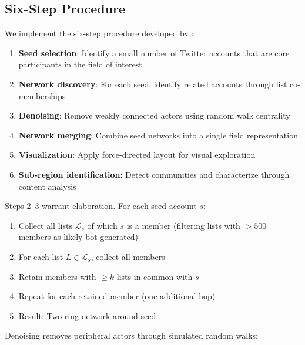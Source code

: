\documentclass[../main.tex]{subfiles}
\begin{document}
\subsection{Six-Step Procedure}

We implement the six-step procedure developed by \textcite{benabdelkrim-opening-fields-2020}:

\begin{enumerate}
    \item \textbf{Seed selection}: Identify a small number of Twitter accounts that are core participants in the field of interest
    \item \textbf{Network discovery}: For each seed, identify related accounts through list co-memberships
    \item \textbf{Denoising}: Remove weakly connected actors using random walk centrality
    \item \textbf{Network merging}: Combine seed networks into a single field representation
    \item \textbf{Visualization}: Apply force-directed layout for visual exploration
    \item \textbf{Sub-region identification}: Detect communities and characterize through content analysis
\end{enumerate}

Steps 2--3 warrant elaboration. For each seed account $s$:

\begin{enumerate}
    \item Collect all lists $\mathcal{L}_s$ of which $s$ is a member (filtering lists with $>500$ members as likely bot-generated)
    \item For each list $L \in \mathcal{L}_s$, collect all members
    \item Retain members with $\geq k$ lists in common with $s$
    \item Repeat for each retained member (one additional hop)
    \item Result: Two-ring network around seed
\end{enumerate}

Denoising removes peripheral actors through simulated random walks:
\end{document}
